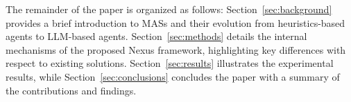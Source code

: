 The remainder of the paper is organized as follows: Section~\ref{sec:background} provides a brief introduction to MASs and their evolution from heuristics-based agents to LLM-based agents. Section~\ref{sec:methods} details the internal mechanisms of the proposed Nexus framework, highlighting key differences with respect to existing solutions. Section~\ref{sec:results} illustrates the experimental results, while Section~\ref{sec:conclusions} concludes the paper with a summary of the contributions and findings.